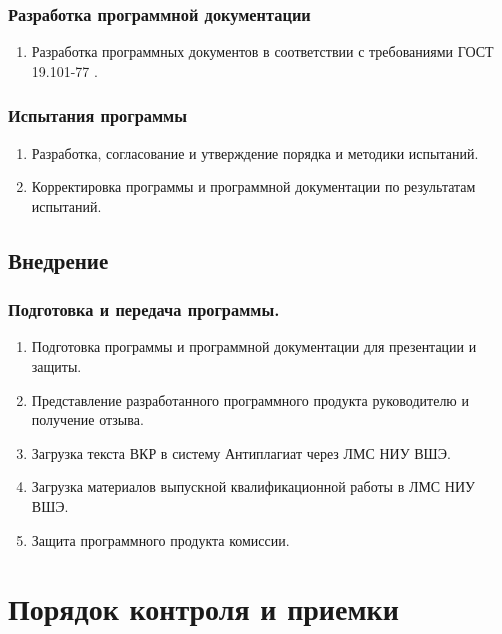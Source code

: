 \documentclass[a4paper,12pt,reqno]{article}
\begin{document}
    \subsubsection{Разработка программной документации}
    \begin{enumerate}
        \item Разработка программных документов в соответствии с требованиями ГОСТ 19.101-77 \cite{TZ:gost0}.
    \end{enumerate}

    \subsubsection{Испытания программы}
    \begin{enumerate}
        \item Разработка, согласование и утверждение порядка и методики испытаний.
        \item Корректировка программы и программной документации по результатам испытаний.
    \end{enumerate}

    \subsection{Внедрение}

    \subsubsection{Подготовка и передача программы.}
    \begin{enumerate}
        \item Подготовка программы и программной документации для презентации и защиты.
        \item Представление разработанного программного продукта руководителю и получение отзыва.
        \item Загрузка текста ВКР в систему Антиплагиат через ЛМС НИУ ВШЭ.
        \item Загрузка материалов выпускной квалификационной работы в ЛМС НИУ ВШЭ.
        \item Защита программного продукта комиссии.
    \end{enumerate}
    \newpage


    \section{Порядок контроля и приемки}
\end{document}
